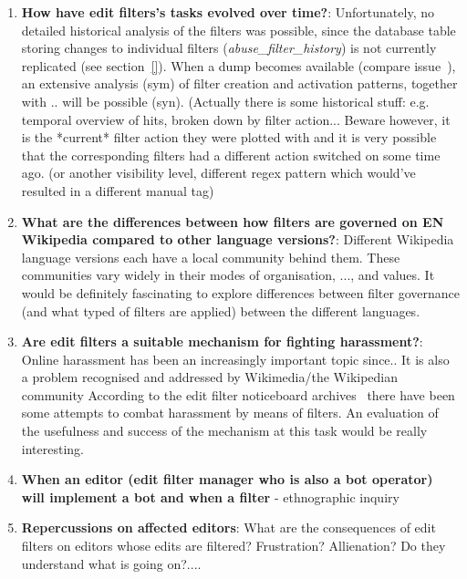 \begin{enumerate}
    \item \textbf{How have edit filters's tasks evolved over time?}: Unfortunately, no detailed historical analysis of the filters was possible, since the database table storing changes to individual filters (\emph{abuse\_filter\_history}) is not currently replicated (see section~\ref{}). When a dump becomes available (compare issue~\cite{phabricator}), an extensive analysis (sym) of filter creation and activation patterns, together with .. will be possible (syn).
        (Actually there is some historical stuff: e.g. temporal overview of hits, broken down by filter action... Beware however, it is the *current* filter action they were plotted with and it is very possible that the corresponding filters had a different action switched on some time ago. %
        (or another visibility level, different regex pattern which would've resulted in a different manual tag)
    \item \textbf{What are the differences between how filters are governed on EN Wikipedia compared to other language versions?}: Different Wikipedia language versions each have a local community behind them. %
        These communities vary widely in their modes of organisation, ..., and values. It would be definitely fascinating to explore differences between filter governance (and what typed of filters are applied) between the different languages.
    \item \textbf{Are edit filters a suitable mechanism for fighting harassment?}: Online harassment has been an increasingly important topic since.. %
        It is also a problem recognised and addressed by Wikimedia/the Wikipedian community %
        According to the edit filter noticeboard archives~\cite{Wikipedia:EditFilterNoticeboardHarassment} there have been some attempts to combat harassment by means of filters.
        An evaluation of the usefulness and success of the mechanism at this task would be really interesting.
    \item \textbf{When an editor (edit filter manager who is also a bot operator) will implement a bot and when a filter} - ethnographic inquiry
    \item \textbf{Repercussions on affected editors}: What are the consequences of edit filters on editors whose edits are filtered? Frustration? Allienation? Do they understand what is going on?....

\end{enumerate}
